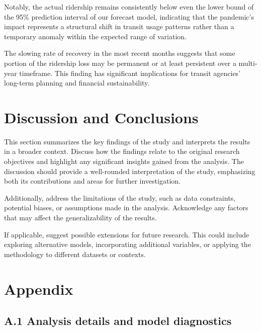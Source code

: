 \documentclass[11pt]{article}
\begin{document}
Notably, the actual ridership remains consistently below even the lower bound of the 95\% prediction interval of our forecast model, indicating that the pandemic's impact represents a structural shift in transit usage patterns rather than a temporary anomaly within the expected range of variation.

The slowing rate of recovery in the most recent months suggests that some portion of the ridership loss may be permanent or at least persistent over a multi-year timeframe. This finding has significant implications for transit agencies' long-term planning and financial sustainability.

\section{Discussion and Conclusions}

This section summarizes the key findings of the study and interprets the results in a broader context. Discuss how the findings relate to the original research objectives and highlight any significant insights gained from the analysis. The discussion should provide a well-rounded interpretation of the study, emphasizing both its contributions and areas for further investigation.

Additionally, address the limitations of the study, such as data constraints, potential biases, or assumptions made in the analysis. Acknowledge any factors that may affect the generalizability of the results.

If applicable, suggest possible extensions for future research. This could include exploring alternative models, incorporating additional variables, or applying the methodology to different datasets or contexts.

\appendix
\section*{Appendix}

\subsection*{A.1 Analysis details and model diagnostics}
\end{document}
